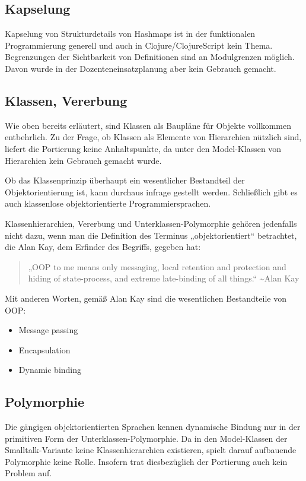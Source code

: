 \documentclass[11pt]{article}
\begin{document}
\subsection*{Kapselung}
\label{sec:org6464970}
Kapselung von Strukturdetails von Hashmaps ist in der funktionalen
Programmierung generell und auch in Clojure/ClojureScript kein
Thema. Begrenzungen der Sichtbarkeit von Definitionen sind an
Modulgrenzen möglich. Davon wurde in der Dozenteneinsatzplanung aber
kein Gebrauch gemacht.

\subsection*{Klassen, Vererbung}
\label{sec:org0ee5930}
Wie oben bereits erläutert, sind Klassen als Baupläne für Objekte
vollkommen entbehrlich. Zu der Frage, ob Klassen als Elemente von
Hierarchien nützlich sind, liefert die Portierung keine Anhaltspunkte,
da unter den Model-Klassen von Hierarchien kein Gebrauch gemacht
wurde.

Ob das Klassenprinzip überhaupt ein wesentlicher Bestandteil der
Objektorientierung ist, kann durchaus infrage gestellt
werden. Schließlich gibt es auch klassenlose objektorientierte
Programmiersprachen. 

Klassenhierarchien, Vererbung und Unterklassen-Polymorphie gehören
jedenfalls nicht dazu, wenn man die Definition des Terminus
„objektorientiert“ betrachtet, die Alan Kay, dem Erfinder des Begriffs,
gegeben hat:
\begin{quote}
„OOP to me means only messaging, local retention and protection and
hiding of state-process, and extreme late-binding of all things.“ 
\textasciitilde{}Alan Kay
\end{quote}
Mit anderen Worten, gemäß Alan Kay sind die wesentlichen Bestandteile
von OOP:
\begin{itemize}
\item Message passing
\item Encapsulation
\item Dynamic binding
\end{itemize}

\subsection*{Polymorphie}
\label{sec:orgf71734a}
Die gängigen objektorientierten Sprachen kennen dynamische Bindung nur
in der primitiven Form der Unterklassen-Polymorphie. Da in den
Model-Klassen der Smalltalk-Variante keine Klassenhierarchien
existieren, spielt darauf aufbauende Polymorphie keine Rolle. Insofern
trat diesbezüglich der Portierung auch kein Problem auf.
\end{document}
